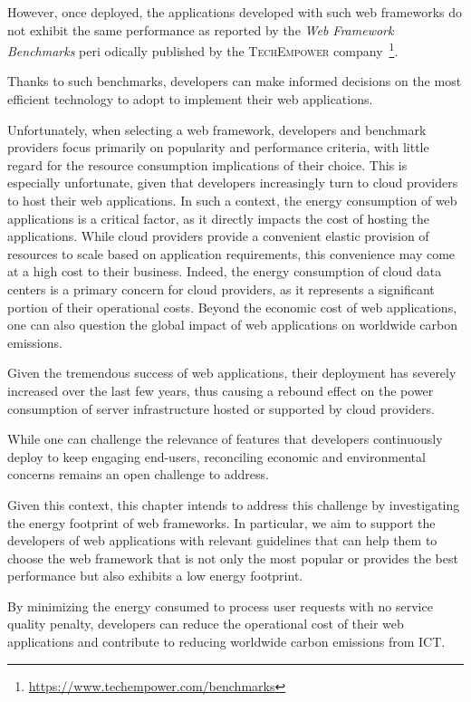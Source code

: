 However, once deployed, the applications developed with such web frameworks do not exhibit the same performance as reported by the \emph{Web Framework Benchmarks} peri odically published by the \textsc{TechEmpower} company~\footnote{\url{https://www.techempower.com/benchmarks}}.

Thanks to such benchmarks, developers can make informed decisions on the most efficient technology to adopt to implement their web applications.

Unfortunately, when selecting a web framework, developers and benchmark providers focus primarily on popularity and performance criteria, with little regard for the resource consumption implications of their choice.
This is especially unfortunate, given that developers increasingly turn to cloud providers to host their web applications.
In such a context, the energy consumption of web applications is a critical factor, as it directly impacts the cost of hosting the applications.
While cloud providers provide a convenient elastic provision of resources to scale based on application requirements, this convenience may come at a high cost to their business.
Indeed, the energy consumption of cloud data centers is a primary concern for cloud providers, as it represents a significant portion of their operational costs.
Beyond the economic cost of web applications, one can also question the global impact of web applications on worldwide carbon emissions.

Given the tremendous success of web applications, their deployment has severely increased over the last few years, thus causing a rebound effect on the power consumption of server infrastructure hosted or supported by cloud providers.

While one can challenge the relevance of features that developers continuously deploy to keep engaging end-users, reconciling economic and environmental concerns remains an open challenge to address.

Given this context, this chapter intends to address this challenge by investigating the energy footprint of web frameworks.
In particular, we aim to support the developers of web applications with relevant guidelines that can help them to choose the web framework that is not only the most popular or provides the best performance but also exhibits a low energy footprint.

By minimizing the energy consumed to process user requests with no service quality penalty, developers can reduce the operational cost of their web applications and contribute to reducing worldwide carbon emissions from ICT.

